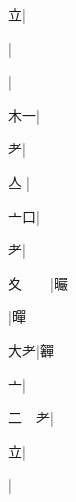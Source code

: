\begin{multicols}{2}
{{\cjk{}{\cnsym{}　}{\cnsym{}　}立}|{}\par
{\cjk{}{\cnsym{}　}{\cnsym{}　}{\cnsym{}　}}|{}\par
{\cjk{}{\cnsym{}　}{\cnsym{}　}{\cnsym{}　}}|{}\par
{\cjk{}{\cnsym{}　}木一}|{}\par
{\cjk{}{\cnsym{}　}{\cnsym{}　}耂}|{}\par
{\cjk{}{\cnsym{}　}亼{\cnjzr{}}}|{}\par
{亠口}|{}\par
{\cjk{}{\cnsym{}　}{\cnsym{}　}耂}|{}\par
{\cjk{}夊{\cnsym{}　}{\cnsym{}　}}|{\cjk{}曮}\par
{\cjk{}{\cnsym{}　}{\cnsym{}　}{\cnsym{}　}}|{\cjk{}暺}\par
{\cjk{}{\cnsym{}　}大耂}|{\cjk{}奲}\par
{\cjk{}{\cnsym{}　}{\cnsym{}　}亠}|{}\par
{\cjk{}二{\cnsym{}　}耂}|{}\par
{\cjk{}{\cnsym{}　}{\cnsym{}　}立}|{}\par
{\cjk{}{\cnsym{}　}{\cnsym{}　}{\cnsym{}　}}|{}\par
}
\end{multicols}
